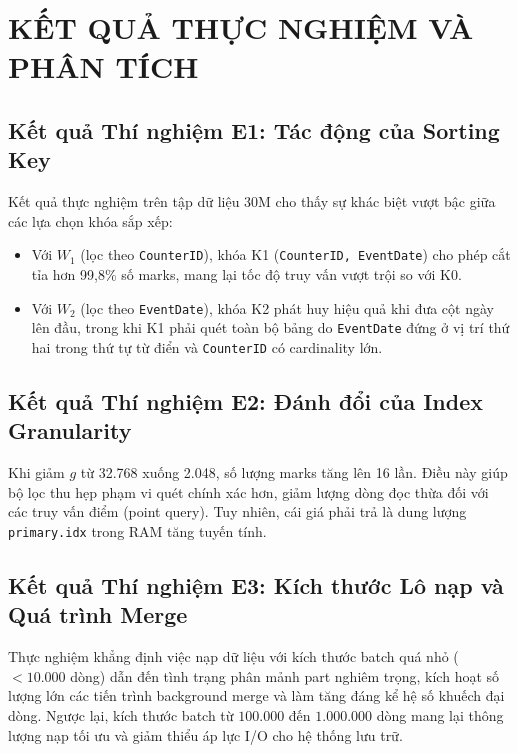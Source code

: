 \section{KẾT QUẢ THỰC NGHIỆM VÀ PHÂN TÍCH}
\label{sec:ket_qua}


\subsection{Kết quả Thí nghiệm E1: Tác động của Sorting Key}
Kết quả thực nghiệm trên tập dữ liệu 30M cho thấy sự khác biệt vượt bậc giữa các lựa chọn khóa sắp xếp:
\begin{itemize}
    \item Với $W_1$ (lọc theo \texttt{CounterID}), khóa K1 (\texttt{CounterID, EventDate}) cho phép cắt tỉa hơn 99,8\% số marks, mang lại tốc độ truy vấn vượt trội so với K0.
    \item Với $W_2$ (lọc theo \texttt{EventDate}), khóa K2 phát huy hiệu quả khi đưa cột ngày lên đầu, trong khi K1 phải quét toàn bộ bảng do \texttt{EventDate} đứng ở vị trí thứ hai trong thứ tự từ điển và \texttt{CounterID} có cardinality lớn.
\end{itemize}


\subsection{Kết quả Thí nghiệm E2: Đánh đổi của Index Granularity}
Khi giảm $g$ từ 32.768 xuống 2.048, số lượng marks tăng lên 16 lần. Điều này giúp bộ lọc thu hẹp phạm vi quét chính xác hơn, giảm lượng dòng đọc thừa đối với các truy vấn điểm (point query). Tuy nhiên, cái giá phải trả là dung lượng \texttt{primary.idx} trong RAM tăng tuyến tính.


\subsection{Kết quả Thí nghiệm E3: Kích thước Lô nạp và Quá trình Merge}
Thực nghiệm khẳng định việc nạp dữ liệu với kích thước batch quá nhỏ ($< 10.000$ dòng) dẫn đến tình trạng phân mảnh part nghiêm trọng, kích hoạt số lượng lớn các tiến trình background merge và làm tăng đáng kể hệ số khuếch đại dòng. Ngược lại, kích thước batch từ $100.000$ đến $1.000.000$ dòng mang lại thông lượng nạp tối ưu và giảm thiểu áp lực I/O cho hệ thống lưu trữ.

